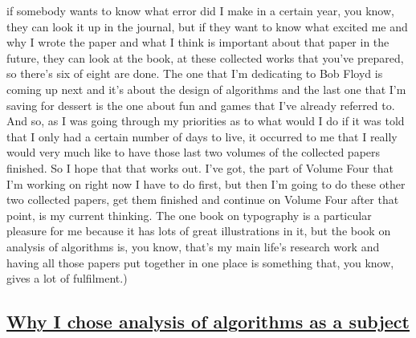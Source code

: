 \documentclass[]{article}
\begin{document}
if somebody wants to know what error did I make in a certain year, you
know, they can look it up in the journal, but if they want to know what
excited me and why I wrote the paper and what I think is important about
that paper in the future, they can look at the book, at these collected
works that you've prepared, so there's six of eight are done. The one
that I'm dedicating to Bob Floyd is coming up next and it's about the
design of algorithms and the last one that I'm saving for dessert is the
one about fun and games that I've already referred to. And so, as I was
going through my priorities as to what would I do if it was told that I
only had a certain number of days to live, it occurred to me that I
really would very much like to have those last two volumes of the
collected papers finished. So I hope that that works out. I've got, the
part of Volume Four that I'm working on right now I have to do first,
but then I'm going to do these other two collected papers, get them
finished and continue on Volume Four after that point, is my current
thinking. The one book on typography is a particular pleasure for me
because it has lots of great illustrations in it, but the book on
analysis of algorithms is, you know, that's my main life's research work
and having all those papers put together in one place is something that,
you know, gives a lot of fulfilment.)

\subsection{\texorpdfstring{\href{http://webofstories.com/play/17156}{Why
I chose analysis of algorithms as a
subject}}{Why I chose analysis of algorithms as a subject}}\label{why-i-chose-analysis-of-algorithms-as-a-subject}
\end{document}
